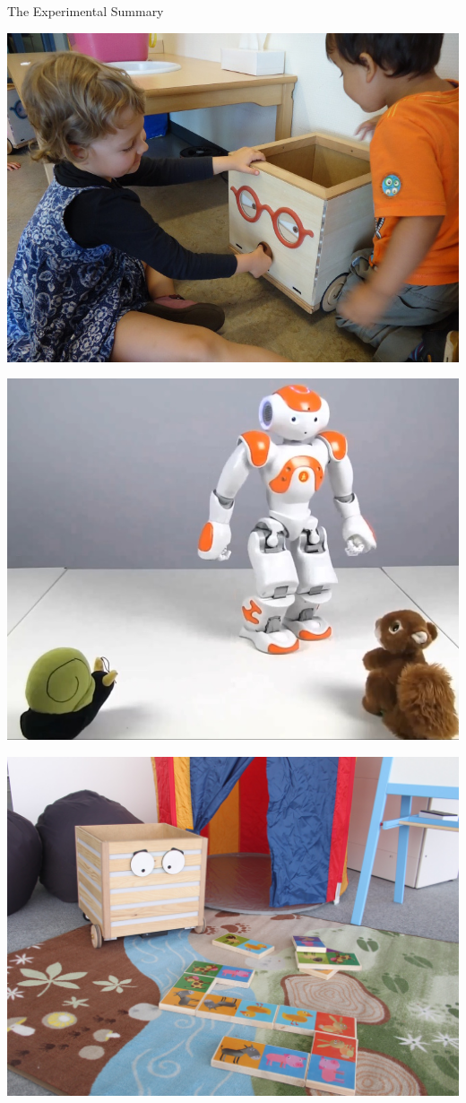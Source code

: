 \documentclass[compress]{beamer}
\begin{document}
{\begin{frame}{The Experimental Summary}
\begin{multicols}{4}
        \includegraphics[width=\columnwidth]{croquignole-single}

        \includegraphics[width=\columnwidth]{stimulus-toys}

        \includegraphics[width=\columnwidth]{ranger-background}


\end{multicols}
\end{frame}}
\end{document}

